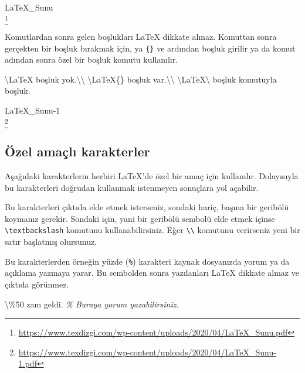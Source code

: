 \documentclass[
  10pt,
]{scrbook}
\newenvironment{Shaded}{\begin{snugshade}}{\end{snugshade}}
\newcommand{\CommentTok}[1]{\textcolor[rgb]{0.56,0.35,0.01}{\textit{#1}}}
\newcommand{\FunctionTok}[1]{\textcolor[rgb]{0.00,0.00,0.00}{#1}}
\newcommand{\NormalTok}[1]{#1}
\renewcommand{\href}[2]{#2\footnote{\url{#1}}}
\begin{document}
\href{https://www.texdizgi.com/wp-content/uploads/2020/04/LaTeX_Sunu.pdf}{LaTeX\_Sunu\\
}

Komutlardan sonra gelen boşlukları LaTeX dikkate almaz. Komuttan sonra
gerçekten bir boşluk bırakmak için, ya \texttt{\{\}} ve ardından boşluk girilir
ya da komut adından sonra özel bir boşluk komutu kullanılır.

\begin{Shaded}
\begin{Highlighting}[]
\NormalTok{\textbackslash{}LaTeX  boşluk yok.\textbackslash{}\textbackslash{}}
\NormalTok{\textbackslash{}LaTeX\{\} boşluk var.\textbackslash{}\textbackslash{}}
\NormalTok{\textbackslash{}LaTeX\textbackslash{} boşluk komutuyla  boşluk.}
\end{Highlighting}
\end{Shaded}

\href{https://www.texdizgi.com/wp-content/uploads/2020/04/LaTeX_Sunu-1.pdf}{LaTeX\_Sunu-1\\
}

\hypertarget{uxf6zel-amauxe7lux131-karakterler}{%
\subsection{Özel amaçlı karakterler}\label{uxf6zel-amauxe7lux131-karakterler}}

Aşağıdaki karakterlerin herbiri LaTeX'de özel bir amaç için kullanılır.
Dolayısıyla bu karakterleri doğrudan kullanmak istenmeyen sonuçlara yol
açabilir.

\begin{Shaded}
\begin{Highlighting}[]
\NormalTok{\#  $  \%   \&   \{   \}   \textasciitilde{}  \^{}  \_ \textbackslash{}}
\end{Highlighting}
\end{Shaded}

Bu karakterleri çıktıda elde etmek isterseniz, sondaki hariç, başına bir
geribölü koymanız gerekir. Sondaki için, yani bir geribölü sembolü elde
etmek içinse \texttt{\textbackslash{}textbackslash} komutunu kullanabilirsiniz. Eğer \texttt{\textbackslash{}\textbackslash{}}
komutunu verirseniz yeni bir satır başlatmış olursunuz.

Bu karakterlerden örneğin yüzde (\texttt{\%}) karakteri kaynak dosyanızda yorum
ya da açıklama yazmaya yarar. Bu sembolden sonra yazılanları LaTeX
dikkate almaz ve çıktıda görünmez.

\begin{Shaded}
\begin{Highlighting}[]
\FunctionTok{\textbackslash{}\%}\NormalTok{50 zam geldi. }
\CommentTok{\% Buraya yorum yazabilirsiniz.}
\end{Highlighting}
\end{Shaded}
\end{document}
